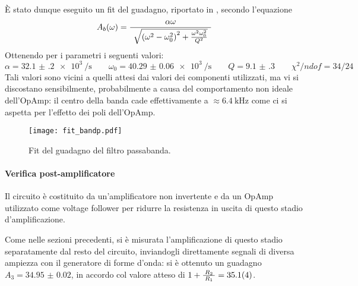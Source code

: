 	È stato dunque eseguito un fit del guadagno, riportato in , secondo l'equazione
	$$ A_b(\omega) = \longfrac{\alpha \omega}{\sqrt{\left(\omega^2 - \omega_0^2\right)^2 + \frac{\omega^2\omega_0^2}{Q^2}}} $$
	Ottenendo per i parametri i seguenti valori:
	$$ \alpha = \SI[per-mode=reciprocal]{32.1(2)e3}{\per\s} \qquad \omega_0 = \SI[per-mode=reciprocal]{40.29(6)e3}{\per\s} \qquad Q = \SI{9.1(3)}  \qquad \chi^2/ndof = 34/24$$
	Tali valori sono vicini a quelli attesi dai valori dei componenti utilizzati, ma vi si discostano sensibilmente, probabilmente a causa del comportamento non ideale dell'OpAmp: il centro della banda cade effettivamente a $\approx\SI{6.4}{\kHz}$ come ci si aspetta per l'effetto dei poli dell'OpAmp.

	\begin{figure}[h]
		\centering
		\texttt{[image: fit\_bandp.pdf]}
		\caption{Fit del guadagno del filtro passabanda.}
		\label{fig:bandfit}
	\end{figure}

	\paragraph{Verifica post-amplificatore}
	Il circuito è costituito da un'amplificatore non invertente e da un OpAmp utilizzato come voltage follower per ridurre la resistenza in uscita di questo stadio d'amplificazione.

	Come nelle sezioni precedenti, si è misurata l'amplificazione di questo stadio separatamente dal resto del circuito, inviandogli direttamente segnali di diversa ampiezza con il generatore di forme d'onda: si è ottenuto un guadagno $A_3 = \num{34.95(2)}$, in accordo col valore atteso di $1 + \longfrac[2pt]{R_2}{R_1} = \num{35.1(4)}$.
